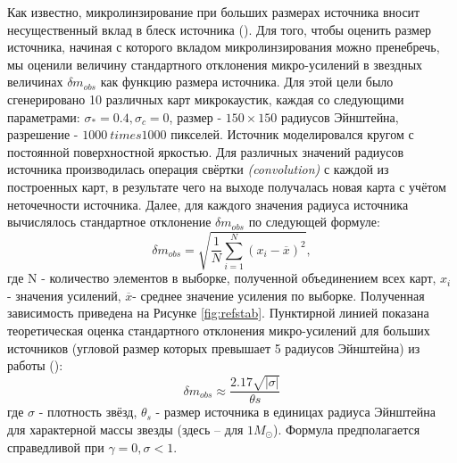 Как известно, микролинзирование при больших размерах источника вносит несущественный вклад в блеск источника (\cite{schneider1992}). Для того, чтобы оценить размер источника, начиная с которого вкладом микролинзирования можно пренебречь, мы оценили величину стандартного отклонения микро-усилений в звездных величинах $\delta m_{obs}$ как функцию размера источника. 
Для этой цели было сгенерировано 10 различных карт микрокаустик, каждая со следующими параметрами: $\sigma_*=0.4, \sigma_c = 0$, размер - $ 150 \times 150 $ радиусов Эйнштейна, разрешение - $1000 \ times 1000$ пикселей. Источник моделировался кругом с постоянной поверхностной яркостью. Для различных значений радиусов источника производилась операция свёртки \textit{(convolution)} с каждой из построенных карт, в результате чего на выходе получалась новая карта с учётом неточечности источника. Далее, для каждого значения радиуса источника вычислялось стандартное отклонение  $\delta m_{o b s}$ по следующей формуле: 
\begin{equation}
\delta m_{o b s}=\sqrt{\frac{1}{N} \sum_{i=1}^{N}\left(x_{i}-\overline{x}\right)^{2}},
\end{equation}
где N - количество элементов в выборке, полученной объединением всех карт, $x_i$ - значения усилений, $\overline x$- среднее значение усиления по выборке. Полученная зависимость приведена на Рисунке \ref{fig:refstab}. Пунктирной линией показана теоретическая оценка стандартного отклонения микро-усилений для больших источников (угловой размер которых превышает 5 радиусов Эйнштейна) из работы (\cite{refsdalstabell1991}):
\begin{equation}
\delta m_{o b s} \approx \frac{2.17 \sqrt{|\sigma|}}{\theta s}
\end{equation}
где $\sigma$ - плотность звёзд, $\theta_s$ - размер источника в единицах радиуса Эйнштейна для характерной массы звезды (здесь -- для $1 M_{\odot} $). Формула предполагается справедливой при $\gamma=0, \sigma < 1$. 

